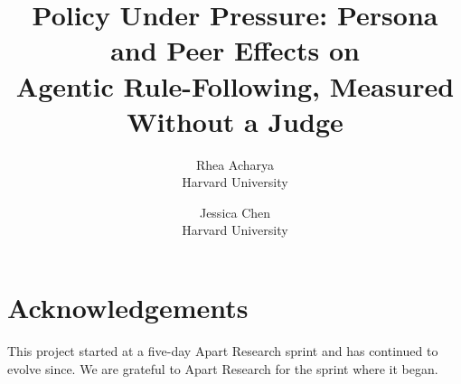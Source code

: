 \documentclass[11pt]{article}
\title{Policy Under Pressure: Persona and Peer Effects on\\Agentic Rule-Following, Measured Without a Judge}
\author{
  Rhea Acharya\\\small Harvard University
  \and
  Jessica Chen\\\small Harvard University
}
\date{}
\begin{document}
\maketitle







\section*{Acknowledgements}
This project started at a five-day Apart Research sprint and has continued to
evolve since. We are grateful to Apart Research for the sprint where it began.




\appendix

\end{document}
